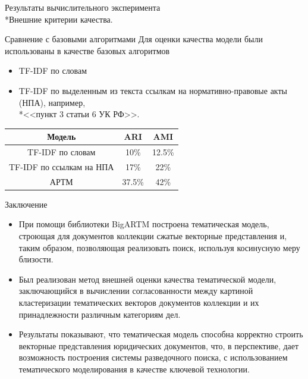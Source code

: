 \documentclass{beamer}
\begin{document}
\begin{frame}{Результаты вычислительного эксперимента \\*Внешние критерии качества.}
\begin{block}{Сравнение с базовыми алгоритмами}
	Для оценки качества модели были использованы в качестве базовых алгоритмов  
    \begin{itemize}
        \item TF-IDF по словам 
        \item TF-IDF по выделенным из текста ссылкам на нормативно-правовые акты (НПА), например, \\*<<пункт 3 статьи 6 УК РФ>>.
    \end{itemize} 
    \end{block}

\begin{table}[H]
\begin{center}
\begin{tabular}{|c|c|c|}
\hline
Модель & ARI & AMI\\
\hline
TF-IDF по словам & 10\% & 12.5\% \\
\hline
TF-IDF по ссылкам на НПА & 17\% & 22\% \\
\hline
АРТМ & 37.5\% & 42\% \\
\hline
\end{tabular}
\end{center}
\end{table}
\end{frame}
\begin{frame}{Заключение}
\begin{itemize}
\item При помощи библиотеки BigARTM построена тематическая модель, строющая для документов коллекции сжатые векторные представления и, таким образом, позволяющая реализовать поиск, используя косинусную меру близости.

\item Был реализован метод внешней оценки качества тематической модели, заключающийся в вычислении согласованности между картиной кластеризации тематических векторов документов коллекции и их принадлежности различным категориям дел.

\item Результаты показывают, что тематическая модель способна корректно строить векторные представления юридических документов, что, в перспективе, дает возможность построения системы разведочного поиска, с использованием тематического моделирования в качестве ключевой технологии.
    \end{itemize} 
\end{frame}
\end{document}

